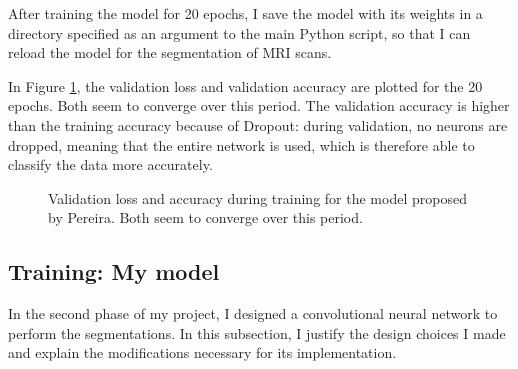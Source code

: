 \documentclass[12pt,a4paper,twoside,openright]{report}
\newlength\figureheight
\newlength\figurewidth
\begin{document}
After training the model for 20 epochs, I save the model with its weights in a directory specified as an argument to the main Python script, so that I can reload the model for the segmentation of MRI scans. 

In Figure \ref{fig:pereira_validation_loss}, the validation loss and validation accuracy are plotted for the 20 epochs. Both seem to converge over this period. The validation accuracy is higher than the training accuracy because of Dropout: during validation, no neurons are dropped, meaning that the entire network is used, which is therefore able to classify the data more accurately.

\begin{figure}
	\centering
	\setlength\figureheight{10cm}
	\setlength{}
	
	\caption[Validation loss and accuracy during training for the model proposed by Pereira.]{Validation loss and accuracy during training for the model proposed by Pereira. Both seem to converge over this period.}
	\label{fig:pereira_validation_loss}
\end{figure}

\subsection{Training: My model}
In the second phase of my project, I designed a convolutional neural network to perform the segmentations. In this subsection, I justify the design choices I made and explain the modifications necessary for its implementation.
\end{document}
